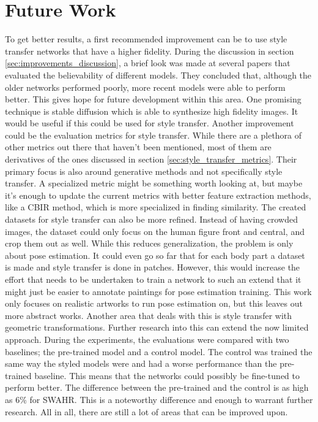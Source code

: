 \section{Future Work}
To get better results, a first recommended improvement can be to use style transfer networks that have a higher fidelity.
During the discussion in section \ref{sec:improvements_discussion}, a brief look was made at several papers that evaluated the believability of different models.
They concluded that, although the older networks performed poorly, more recent models were able to perform better.
This gives hope for future development within this area.
One promising technique is stable diffusion \cite{rombach2021} which is able to synthesize high fidelity images.
It would be useful if this could be used for style transfer.
Another improvement could be the evaluation metrics for style transfer.
While there are a plethora of other metrics out there that haven't been mentioned, most of them are derivatives of the ones discussed in section \ref{sec:style_transfer_metrics}.
Their primary focus is also around generative methods and not specifically style transfer.
A specialized metric might be something worth looking at, but maybe it's enough to update the current metrics with better feature extraction methods, like a \gls{CBIR} method, which is more specialized in finding similarity.
The created datasets for style transfer can also be more refined.
Instead of having crowded images, the dataset could only focus on the human figure front and central, and crop them out as well.
While this reduces generalization, the problem is only about pose estimation.
It could even go so far that for each body part a dataset is made and style transfer is done in patches.
However, this would increase the effort that needs to be undertaken to train a network to such an extend that it might just be easier to annotate paintings for pose estimation training.
This work only focuses on realistic artworks to run pose estimation on, but this leaves out more abstract works.
Another area that deals with this is style transfer with geometric transformations.
Further research into this can extend the now limited approach.
During the experiments, the evaluations were compared with two baselines; the pre-trained model and a control model.
The control was trained the same way the styled models were and had a worse performance than the pre-trained baseline.
This means that the networks could possibly be fine-tuned to perform better.
The difference between the pre-trained and the control is as high as 6\% for SWAHR.
This is a noteworthy difference and enough to warrant further research.
All in all, there are still a lot of areas that can be improved upon.